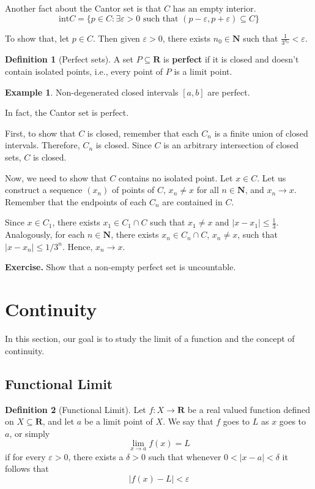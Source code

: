 \documentclass[tikz,12pt,a4paper]{article}
\theoremstyle{definition}
\newtheorem{example}{Example}[section]
\newtheorem{definition}{Definition}[section]
\begin{document}
Another fact about the Cantor set is that $C$ has an empty interior.
\[
	\text{int} C = \{ p \in C : \exists \varepsilon > 0 \text{ such that } (p-\varepsilon, p+\varepsilon) \subseteq C \}
\]

To show that, let $p \in C$. Then given $\varepsilon > 0$, there exists $n_0 \in \textbf{N}$ such that $\frac{1}{3^{n_0}} < \varepsilon$. 

\begin{definition}[Perfect sets]
	A set $P \subseteq \textbf{R}$ is \textbf{perfect} if it is closed and doesn't contain isolated points, i.e., every point of $P$ is a limit point.
\end{definition}

\begin{example}
	Non-degenerated closed intervals $[a,b]$ are perfect.
\end{example}

In fact, the Cantor set is perfect. 

First, to show that $C$ is closed, remember that each $C_n$ is a finite union of closed intervals. Therefore, $C_n$ is closed. Since $C$ is an arbitrary intersection of closed sets, $C$ is closed.

Now, we need to show that $C$ contains no isolated point. Let $x \in C$. Let us construct a sequence $(x_n)$ of points of $C$, $x_n \neq x$ for all $n \in \textbf{N}$, and $x_n \to x$. Remember that the endpoints of each $C_n$ are contained in $C$.

Since $x \in C_1$, there exists $x_1 \in C_1 \cap C$ such that $x_1 \neq x$ and $|x - x_1| \leq \frac{1}{3}$. Analogously, for each $n \in \textbf{N}$, there exists $x_n \in C_n \cap C$, $x_n \neq x$, such that $|x - x_n| \leq 1/3^n$. Hence, $x_n \to x$.

\textbf{Exercise.} Show that a non-empty perfect set is uncountable.

\newpage

\section{Continuity}

In this section, our goal is to study the limit of a function and the concept of continuity.

\subsection{Functional Limit}

\begin{definition}[Functional Limit]
	Let $f : X \longrightarrow \textbf{R}$ be a real valued function defined on $X \subseteq \textbf{R}$, and let $a$ be a limit point of $X$. We say that $f$ goes to $L$ as $x$ goes to $a$, or simply
	\[
		\lim_{x \to a} f(x) = L
	\]
	if for every $\varepsilon > 0$, there exists a $\delta > 0$ such that whenever $0 < |x - a| < \delta$ it follows that
	\[
		|f(x) - L| < \varepsilon
	\]
\end{definition}
\end{document}
